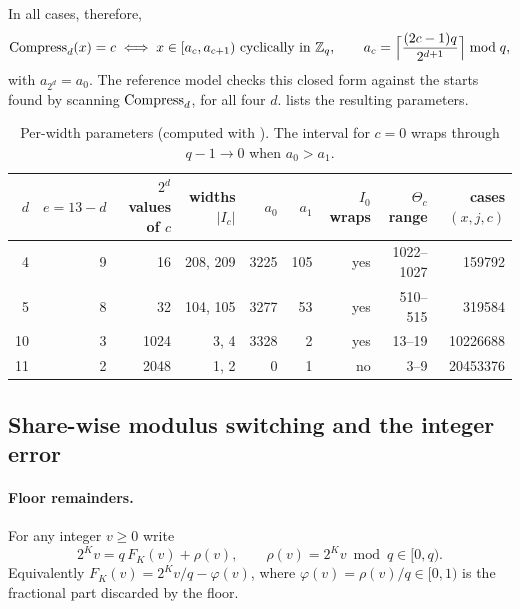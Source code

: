 In all cases, therefore,
\begin{equation}\label{eq:app-interval}
  \operatorname{Compress}_d(x) = c \iff x \in [a_c, a_{c+1}) \text{ cyclically in } \mathbb{Z}_q, \qquad a_c = \Bigl\lceil \frac{(2c-1)q}{2^{d+1}} \Bigr\rceil \bmod q ,
\end{equation}
with $a_{2^d} = a_0$. The reference model checks this closed form against the starts found by scanning $\operatorname{Compress}_d$, for all four $d$.  lists the resulting parameters.

\begin{table}[h]\centering\small
\caption{Per-width parameters (computed with ). The interval for $c = 0$ wraps through $q-1 \to 0$ when $a_0 > a_1$.}\label{tab:widths}
\begin{tabular}{@{}rrrrrrrrr@{}}
\toprule
$d$ & $e = 13-d$ & $2^d$ values of $c$ & widths $|I_c|$ & $a_0$ & $a_1$ & $I_0$ wraps & $\Theta_c$ range & cases $(x,j,c)$ \\
\midrule
4 & 9 & 16 & 208, 209 & 3225 & 105 & yes & 1022--1027 & \num{159792} \\
5 & 8 & 32 & 104, 105 & 3277 & 53 & yes & 510--515 & \num{319584} \\
10 & 3 & 1024 & 3, 4 & 3328 & 2 & yes & 13--19 & \num{10226688} \\
11 & 2 & 2048 & 1, 2 & 0 & 1 & no & 3--9 & \num{20453376} \\
\bottomrule
\end{tabular}
\end{table}

\subsection{Share-wise modulus switching and the integer error}\label{app:math-lemma}
\paragraph{Floor remainders.} For any integer $v \ge 0$ write
\begin{equation}
  2^K v = q\,F_K(v) + \rho(v), \qquad \rho(v) = 2^K v \bmod q \in [0, q).
\end{equation}
Equivalently $F_K(v) = 2^K v/q - \varphi(v)$, where $\varphi(v) = \rho(v)/q \in [0, 1)$ is the fractional part discarded by the floor.

